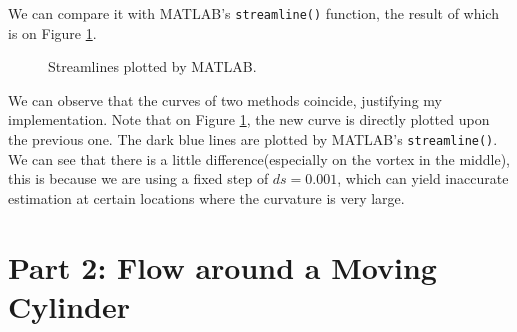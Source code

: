 \documentclass{article}
\begin{document}
  We can compare it with MATLAB's \texttt{streamline()} function, the result of which is on Figure \ref{fig:standardStreamline}.
  \begin{figure}
    \centering
    \noindent{}
    \caption{Streamlines plotted by MATLAB.} \label{fig:standardStreamline}
  \end{figure}
  We can observe that the curves of two methods coincide, justifying my implementation. Note that on Figure \ref{fig:standardStreamline}, the new curve is directly plotted upon the previous one. The dark blue lines are plotted by MATLAB's \texttt{streamline()}. We can see that there is a little difference(especially on the vortex in the middle), this is because we are using a fixed step of $ds = 0.001$, which can yield inaccurate estimation at certain locations where the curvature is very large.
  
  \section{Part 2: Flow around a Moving Cylinder}
\end{document}
